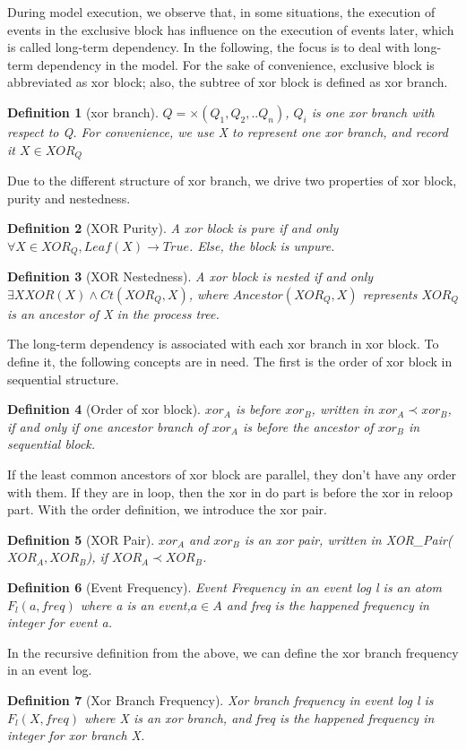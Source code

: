 \documentclass[]{article}
\newtheorem{mydef}{Definition}[section]
\begin{document}
During model execution, we observe that, in some situations, the execution of events in the exclusive block has influence on the execution of events later, which is called long-term dependency. In the following, the focus is to deal with long-term dependency in the model. 
For the sake of convenience, exclusive block is abbreviated as xor block; also, the subtree of xor block is defined as xor branch. 
\begin{mydef}[xor branch]
   $Q= \times(Q_1 , Q_2 ,.. Q_n)$, $Q_i$ is one xor branch with respect to Q. For convenience, we use X to represent one xor branch, and record it $X\in XOR_{Q}$
\end{mydef}
Due to the different structure of xor branch, we drive two properties of xor block, purity and nestedness. 
\begin{mydef}[XOR Purity]
	A xor block is pure if and only $\forall X\in XOR_Q, Leaf(X) \rightarrow True$. Else, the block is unpure.
\end{mydef}
\begin{mydef}[XOR Nestedness]
	A xor block is nested if and only $\exists X XOR(X) \land Ct(XOR_Q,X) $, where $Ancestor(XOR_Q,X)$ represents $XOR_Q$ is an ancestor of X in the process tree.
\end{mydef}
The long-term dependency is associated with each xor branch in xor block. To define it, the following concepts are in need. The first is the order of xor block in sequential structure.
\begin{mydef}[Order of xor block]
	$xor_A$ is before $xor_B$, written in $xor_A \prec xor_B$, if and only if one ancestor branch of $xor_A$ is before the ancestor of $xor_B$ in sequential block. 
\end{mydef}
If the least common ancestors of xor block are parallel, they don't have any order with them. If they are in loop, then the xor in do part is before the xor in reloop part. With the order definition, we introduce the xor pair.
\begin{mydef}[XOR Pair]
	$xor_A$ and $xor_B$ is an xor pair, written in XOR\_Pair($XOR_A, XOR_B$), if $XOR_A \prec XOR_B$.
\end{mydef}
\begin{mydef}[Event Frequency]
	Event Frequency in an event log l is an atom $F_{l}(a,freq)$ where a is an event,$a \in A$  and freq is the happened frequency in integer for event a.
\end{mydef}
In the recursive definition from the above, we can define the xor branch frequency in an event log.
\begin{mydef}[Xor Branch Frequency]
	Xor branch frequency in event log l is $F_{l}(X,freq)$ where X is an xor branch, and freq is the happened frequency in integer for xor branch X.
\end{mydef}
  
\end{document}
